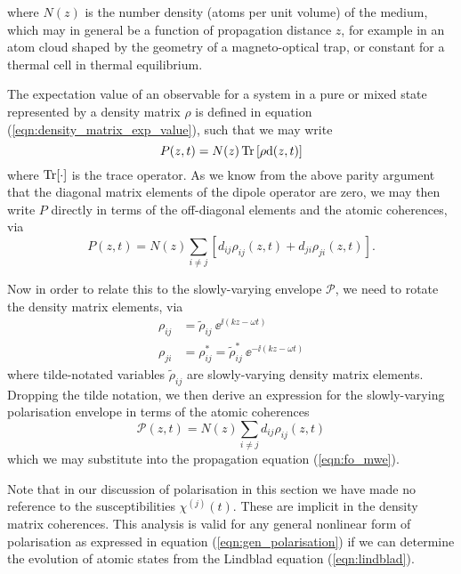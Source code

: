     where $N(z)$ is the number density (atoms per unit volume) of the medium,
    which may in general be a function of propagation distance $z$, for example
    in an atom cloud shaped by the geometry of a magneto-optical
    trap\cite{Adams1997}, or constant for a thermal cell in thermal equilibrium.

    The expectation value of an observable for a system in a pure or mixed state
    represented by a density matrix $\rho$ is defined in equation
    (\ref{eqn:density_matrix_exp_value}), such that we may write
    \begin{equation}
      P(z,t) = N(z) \operatorname{Tr}{ \left[ \rho \mathrm{d}(z,t) \right] }
    \end{equation}
    where $\operatorname{Tr}[\cdot]$ is the trace operator. As we know from the above parity argument
    that the diagonal matrix elements of the dipole operator are zero, we may
    then write $P$ directly in terms of the off-diagonal elements and the atomic
    coherences, via
    \begin{equation}
      P(z,t) = N(z) \sum_{i \ne j}{\left[ d_{ij} \rho_{ij}(z,t) + 
                                 d_{ji} \rho_{ji}(z,t) \right] }.
    \end{equation}

    Now in order to relate this to the slowly-varying envelope $\mathcal{P}$, we
    need to rotate the density matrix elements, via
    \begin{align*}
      \rho_{ij} &= \tilde{\rho}_{ij} ~ \ee^{\ii (k z - \omega t)} \\
      \rho_{ji} &= \rho^*_{ij} = \tilde{\rho}^*_{ij} ~ \ee^{-\ii (k z - \omega t)}
    \end{align*}
    where tilde-notated variables $\tilde{\rho}_{ij}$ are slowly-varying density
    matrix elements. Dropping the tilde notation, we then derive an expression
    for the slowly-varying polarisation envelope in terms of the atomic
    coherences
    \begin{equation} 
      \mathcal{P}(z,t) = N(z) \sum_{i \ne j} d_{ij} \rho_{ij}(z,t)
      \label{eqn:polarisation_coherences}
    \end{equation} 
    which we may substitute into the propagation equation
    (\ref{eqn:fo_mwe}).

    Note that in our discussion of polarisation in this section we have made no
    reference to the susceptibilities $\chi^{(j)}(t)$. These are implicit in the
    density matrix coherences. This analysis is valid for any general nonlinear
    form of polarisation as expressed in equation (\ref{eqn:gen_polarisation})
    if we can determine the evolution of atomic states from the Lindblad
    equation (\ref{eqn:lindblad}). 

